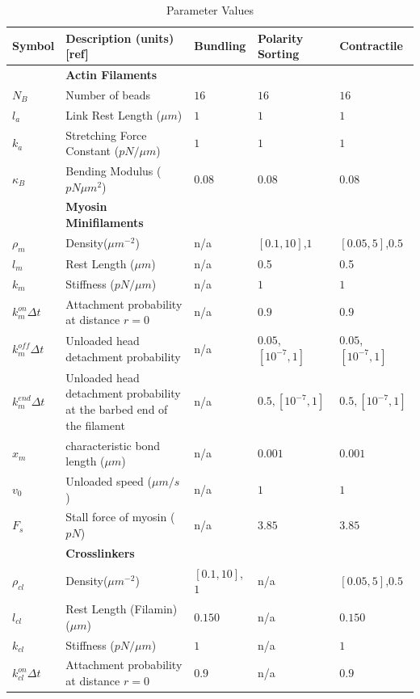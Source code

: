 \documentclass[12pt]{article}
\begin{document}
\begin{table}
  \caption{Parameter Values}
  \centering
  \begin{tabular}{|C{1cm}|L{7cm}|C{2.3cm}|C{2.3cm}|C{2.3cm}|}
    \hline\hline
    Symbol & Description (units) [ref] & Bundling & Polarity Sorting & Contractile\\
    \hline
    &\bf{Actin Filaments}& & & \\
    \hline
    $N_B$ & Number of beads & $16$ & $16$ &$16$\\
    $l_a$ & Link Rest Length ($\mu m$)\cite{odijk1983}& $1$ &$1$& $1$\\
    $k_a$ & Stretching Force Constant ($pN/\mu m$) & $1$ & $1$ & $1$\\
    $\kappa_B$ & Bending Modulus ($pN\mu m^2$)\cite{ott1993} & $0.08$ & $0.08$ & $0.08$\\
    \hline
    &\bf{Myosin Minifilaments}& & & \\
    \hline
    $\rho_m$ & Density($\mu m^{-2}$)& n/a & $[0.1,10]$,$1$&$[0.05,5]$,$0.5$\\
    $l_m$ & Rest Length ($\mu m$)\cite{niederman1975} & n/a & 0.5 & 0.5\\
    $k_m$ & Stiffness ($pN/\mu m$)& n/a & $1$ & $1$\\
    $k^{on}_m\Delta t$ & Attachment probability at distance $r=0$ & n/a & $0.9$ &$0.9$\\
    $k^{off}_m\Delta t$ & Unloaded head detachment probability  & n/a & $0.05$, $[10^{-7},1]$ & $0.05$, $[10^{-7},1]$\\
    $k^{end}_m\Delta t$ & Unloaded head detachment probability at the barbed end of the filament 
    & n/a & $0.5,[10^{-7},1]$ &$0.5,[10^{-7},1]$\\
    $x_m$ & characteristic bond length ($\mu m$) \cite{stam2015}& n/a& $0.001$ & $0.001$\\
    $v_0$ & Unloaded speed ($\mu m/s$) \cite{kron1986}&  n/a & $1$ & $1$\\
    $F_s$ & Stall force of myosin ($pN$)\cite{veigel2003}& n/a & $3.85$ & $3.85$\\
    \hline
    &\bf{Crosslinkers} & & & \\
    \hline
    $\rho_{cl}$ & Density($\mu m^{-2}$) &$[0.1,10]$,$1$&n/a&$[0.05,5]$,$0.5$\\
    $l_{cl}$& Rest Length (Filamin) ($\mu m$)\cite{ferrer2008} &$0.150$ &n/a&$0.150$ \\
    $k_{cl}$ & Stiffness ($pN/\mu m$)& $1$ & n/a& $1$\\
    $k^{on}_{cl}\Delta t$ & Attachment probability at distance $r=0$ & $0.9$ & n/a &$0.9$\\

\end{tabular}
\end{table}
\end{document}
